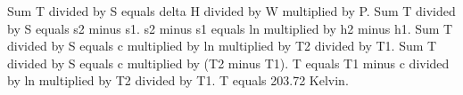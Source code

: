 Sum T divided by S equals delta H divided by W multiplied by P.  
Sum T divided by S equals s2 minus s1.  
s2 minus s1 equals ln multiplied by h2 minus h1.  
Sum T divided by S equals c multiplied by ln multiplied by T2 divided by T1.  
Sum T divided by S equals c multiplied by (T2 minus T1).  
T equals T1 minus c divided by ln multiplied by T2 divided by T1.  
T equals 203.72 Kelvin.
